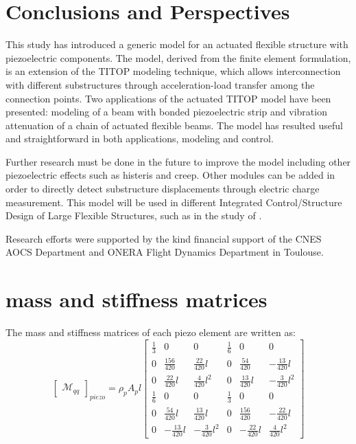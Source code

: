 \documentclass{ifacconf}
\begin{document}
\section{Conclusions and Perspectives}


This study has introduced a generic model for an actuated flexible structure with piezoelectric components. The model, derived from the finite element formulation, is an extension of the TITOP modeling technique, which allows interconnection with different substructures through acceleration-load transfer among the connection points. Two applications of the actuated TITOP model have been presented: modeling of a beam with bonded piezoelectric strip and vibration attenuation of a chain of actuated flexible beams. The model has resulted useful and straightforward in both applications, modeling and control.

Further research must be done in the future to improve the model including other piezoelectric effects such as histeris and creep. Other modules can be added in order to directly detect substructure displacements through electric charge measurement. This model will be used in different Integrated Control/Structure Design of Large Flexible Structures, such as in the study of \cite{Perez2016_ID}. 


\begin{ack}
Research efforts were supported by the kind financial support of the CNES AOCS Department and ONERA Flight Dynamics Department in Toulouse.
\end{ack}

             















\appendix

\section{mass and stiffness matrices}    \label{sec:appendix1}
The mass and stiffness matrices of each piezo element are written as:
\begin{equation}
\label{eq:m}
\begin{bmatrix}
\mathcal{M}_{qq}
\end{bmatrix}_{piezo} = \rho_pA_pl\begin{bmatrix}
 \frac{1}{3} & 0 & 0 & \frac{1}{6} & 0 & 0\\ 0 & \frac{156}{420} & \frac{22}{420}l &0  &\frac{54}{420} & -\frac{13}{420}l \\ 0 & \frac{22}{420}l & \frac{4}{420}l^2 & 0 & \frac{13}{420}l & - \frac{3}{420}l^2 \\ \frac{1}{6} & 0 & 0 & \frac{1}{3} &0 & 0 \\  0 & \frac{54}{420}l & \frac{13}{420}l & 0 & \frac{156}{420} & - \frac{22}{420}l \\ 0 & -\frac{13}{420}l & -\frac{3}{420}l^2 & 0 & -\frac{22}{420}l & \frac{4}{420}l^2
\end{bmatrix}
\end{equation}
\end{document}
